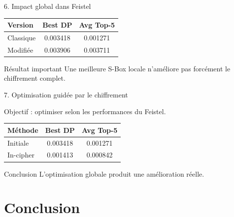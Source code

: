 \documentclass[10pt]{beamer}
\begin{document}
\begin{frame}{6. Impact global dans Feistel}

\begin{center}
\begin{tabular}{lcc}
\toprule
Version & Best DP & Avg Top-5 \\
\midrule
Classique & 0.003418 & 0.001271 \\
Modifiée & 0.003906 & 0.003711 \\
\bottomrule
\end{tabular}
\end{center}

\vspace{0.4cm}

\begin{alertblock}{Résultat important}
Une meilleure S-Box locale n'améliore pas forcément le chiffrement complet.
\end{alertblock}

\end{frame}


\begin{frame}{7. Optimisation guidée par le chiffrement}

Objectif : optimiser selon les performances du Feistel.

\vspace{0.4cm}

\begin{center}
\begin{tabular}{lcc}
\toprule
Méthode & Best DP & Avg Top-5 \\
\midrule
Initiale & 0.003418 & 0.001271 \\
In-cipher & 0.001413 & 0.000842 \\
\bottomrule
\end{tabular}
\end{center}

\vspace{0.4cm}

\begin{block}{Conclusion}
L'optimisation globale produit une amélioration réelle.
\end{block}

\end{frame}

\section{Conclusion}
\end{document}

